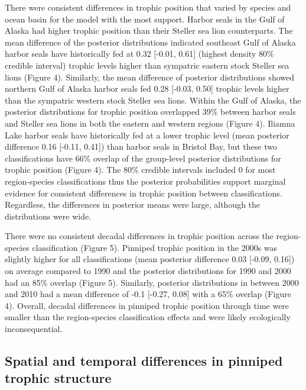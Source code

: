 \documentclass [11pt, proquest] {uwthesis}[2015/03/03]
\begin{document}
There were consistent differences in trophic position that varied by
species and ocean basin for the model with the most support. Harbor
seals in the Gulf of Alaska had higher trophic position than their
Steller sea lion counterparts. The mean difference of the posterior
distributions indicated southeast Gulf of Alaska harbor seals have
historically fed at 0.32 {[}-0.01, 0.61{]} (highest density 80\%
credible interval) trophic levels higher than sympatric eastern stock
Steller sea lions (Figure 4). Similarly, the mean difference of
posterior distributions showed northern Gulf of Alaska harbor seals fed
0.28 {[}-0.03, 0.50{]} trophic levels higher than the sympatric western
stock Steller sea lions. Within the Gulf of Alaska, the posterior
distributions for trophic position overlapped 39\% between harbor seals
and Steller sea lions in both the eastern and western regions (Figure
4). Iliamna Lake harbor seals have historically fed at a lower trophic
level (mean posterior difference 0.16 {[}-0.11, 0.41{]}) than harbor
seals in Bristol Bay, but these two classifications have 66\% overlap of
the group-level posterior distributions for trophic position (Figure 4).
The 80\% credible intervals included 0 for most region-species
classifications thus the posterior probabilities support marginal
evidence for consistent differences in trophic position between
classifications. Regardless, the differences in posterior means were
large, although the distributions were wide.

There were no consistent decadal differences in trophic position across
the region-species classification (Figure 5). Pinniped trophic position
in the 2000s was slightly higher for all classifications (mean posterior
difference 0.03 {[}-0.09, 0.16{]}) on average compared to 1990 and the
posterior distributions for 1990 and 2000 had an 85\% overlap (Figure
5). Similarly, posterior distributions in between 2000 and 2010 had a
mean difference of -0.1 {[}-0.27, 0.08{]} with a 65\% overlap (Figure
4). Overall, decadal differences in pinniped trophic position through
time were smaller than the region-species classification effects and
were likely ecologically inconsequential.

\subsection{Spatial and temporal differences in pinniped trophic
structure}\label{spatial-and-temporal-differences-in-pinniped-trophic-structure}
\end{document}
